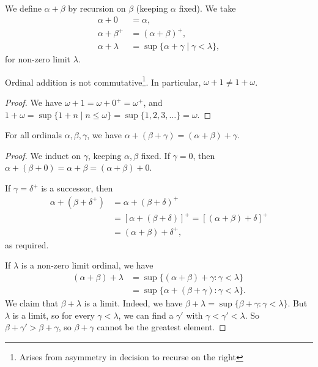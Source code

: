 \documentclass[a3paper, 10pt]{article}
\begin{document}
\begin{multicols*}{5}
\begin{definition}
We define $\alpha + \beta$ by recursion on $\beta$ (keeping $\alpha$ fixed).
We take
\begin{align*}
  \alpha + 0 &= \alpha,\\
  \alpha + \beta^+ &= (\alpha + \beta)^+,\\
  \alpha + \lambda &= \sup\{\alpha + \gamma \mid \gamma < \lambda\},
\end{align*}
for non-zero limit $\lambda$.
\end{definition}

\begin{proposition}
  Ordinal addition is not commutative\footnote{Arises from asymmetry in decision to recurse on the right}. In particular, $\omega + 1 \neq 1 + \omega$.
\end{proposition}
\begin{proof}
  We have $\omega+1 = \omega + 0^+ = \omega^+$, and $1 + \omega = \sup\{1 + n \mid n \leq \omega\} = \sup \{1, 2, 3, \dots\} = \omega$.
\end{proof}

\begin{proposition}
  For all ordinals $\alpha, \beta, \gamma$, we have $\alpha + (\beta + \gamma) = (\alpha + \beta) + \gamma$.
\end{proposition}
\begin{proof}
We induct on $\gamma$, keeping $\alpha, \beta$ fixed. If $\gamma=0$, then $\alpha+(\beta+0)= \alpha+\beta=(\alpha+\beta)+0$.

If $\gamma = \delta^+$ is a successor, then
\begin{align*}
  \alpha + (\beta + \delta^+) &= \alpha + (\beta + \delta)^+ \\
  &= [\alpha + (\beta + \delta)]^+ = [(\alpha + \beta) + \delta]^+ \\
  &= (\alpha + \beta) + \delta^+,
\end{align*}
as required.

If $\lambda$ is a non-zero limit ordinal, we have
\begin{align*}
(\alpha+\beta)+\lambda & =\sup \{(\alpha+\beta)+\gamma: \gamma<\lambda\} \\
& =\sup \{\alpha+(\beta+\gamma): \gamma<\lambda\} .
\end{align*}
We claim that $\beta+\lambda$ is a limit.
Indeed, we have $\beta+\lambda=\sup \{\beta+\gamma: \gamma<\lambda\}$. 
But $\lambda$ is a limit, so for every $\gamma < \lambda$, we can find a $\gamma'$ with $\gamma < \gamma' < \lambda$. So $\beta + \gamma' > \beta + \gamma$, so $\beta + \gamma$ cannot be the greatest element.


\end{proof}
\end{multicols*}
\end{document}
